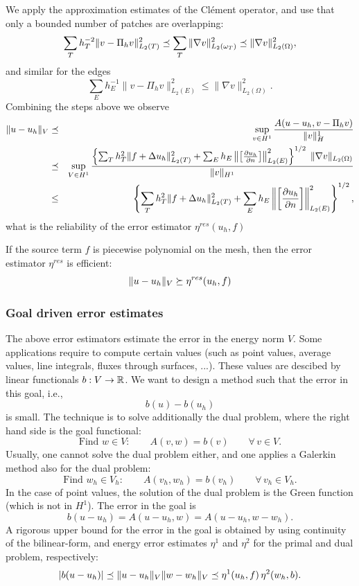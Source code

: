 We apply the approximation estimates of the Cl\'ement operator, and use that
only a bounded number of patches are overlapping:
$$
\sum_T h_T^{-2} \| v - \Pi_h v \|_{L_2(T)}^2 
 \preceq
\sum_T \| \nabla v \|_{L_2(\omega_T)}^2  \preceq \| \nabla v \|_{L_2(\Omega)}^2,
$$
and similar for the edges
$$
\sum_E h_E^{-1} \| v - \Pi_h v \|_{L_2(E)}^2 \leq \| \nabla v \|_{L_2(\Omega)}^2.
$$
Combining the steps above we observe
\begin{eqnarray*}
\| u - u_h \|_V & \preceq & \sup_{v \in H^1} \frac{A(u-u_h, v -\Pi_h v)}{\| v \|_H^1} \\
 & \preceq &  \sup_{V \in H^1}
         \frac{
        \left\{ 
        \sum_T h_T^2 \| f + \Delta u_h \|_{L_2(T)}^2  +
        \sum_E h_E \left\| \left[ \frac{\partial u_h}{\partial n} \right] \right\|_{L_2(E)}^2 \right\}^{1/2}  
        \; \| \nabla v \|_{L_2(\Omega)} }
        { \| v \|_{H^1} } \\
        & \leq &
        \left\{ 
        \sum_T h_T^2 \| f + \Delta u_h \|_{L_2(T)}^2  +
        \sum_E h_E \left\| \left[ \frac{\partial u_h}{\partial n} \right] \right\|_{L_2(E)}^2 \right\}^{1/2},
\end{eqnarray*}
what is the reliability of the  error estimator $\eta^{res}(u_h,f)$

\bigskip


\begin{theorem} If the source term $f$ is piecewise polynomial on the mesh, then the error estimator $\eta^{res}$ is efficient:
$$
\| u - u_h \|_V \succeq \eta^{res} (u_h, f)
$$
\end{theorem}

\subsubsection{Goal driven error estimates}
% 
The above error estimators estimate the error in the energy norm $V$.
Some applications require to compute certain values (such as point values, average values, line integrals, fluxes through surfaces, ...). These 
values are descibed by linear functionals $b : V \rightarrow {\mathbb R}$.
We want to design a method such that the error in this goal, i.e.,
$$
b(u) - b(u_h) 
$$
is small. The technique is to solve additionally the dual problem, where 
the right hand side is the goal functional:
$$
\mbox{Find } w \in V : \qquad A(v, w) = b(v) \qquad \forall \, v \in V.
$$
Usually, one cannot solve the dual problem either, and one applies a Galerkin method also for the dual problem:
$$
\mbox{Find } w_h \in V_h : \qquad A(v_h, w_h) = b(v_h) \qquad \forall \, v_h \in V_h.
$$
In the case of point values, the solution of the dual problem is the Green
function (which is not in $H^1$). The error in the goal is
$$
b(u-u_h) = A(u-u_h, w) = A(u-u_h, w-w_h).
$$
A rigorous upper bound for the error in the goal is obtained by using
continuity of the bilinear-form, and energy error estimates 
$\eta^1$ and $\eta^2$ for the primal and
dual problem, respectively:
$$
| b(u-u_h) | \preceq \| u - u_h \|_V \| w - w_h \|_V \preceq
         \eta^1(u_h, f) \, \eta^2(w_h, b).
$$

